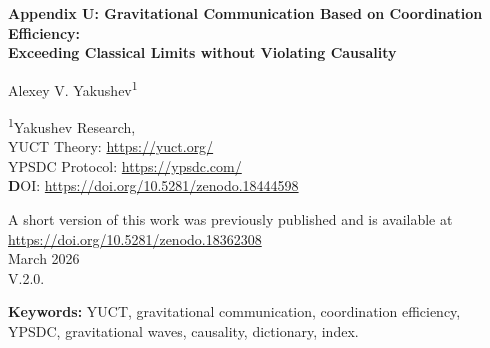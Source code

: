 \documentclass[12pt,a4paper]{article}
\newcommand{\Keff}{K_{\mathrm{eff}}}
\begin{document}
	
	\begin{titlepage}
		\begin{center}
			\vspace*{1cm}
			\Huge \textbf{Appendix U: Gravitational Communication Based on Coordination Efficiency: \\ Exceeding Classical Limits without Violating Causality}
			
			\vspace{1cm}
			\Large Alexey V. Yakushev\textsuperscript{1}
			
			\vspace{0.5cm}
			\large \textsuperscript{1}Yakushev Research, \\
	YUCT Theory: \url{https://yuct.org/}\\
YPSDC Protocol: \url{https://ypsdc.com/}\\


\vspace{2cm}
\textbf DOI: \url{https://doi.org/10.5281/zenodo.18444598}\\

\vspace{1cm}

\vspace{0cm}
\large 
A short version of this work was previously published and is available at\\ \url{https://doi.org/10.5281/zenodo.18362308}\\
\vspace{1cm}
March 2026 \\ \large V.2.0.
			
			\newpage
			\vspace{2cm}
			\begin{abstract}
				\noindent
				We propose a novel approach to long‑distance communication based on the Yakushev Unified Coordination Theory (YUCT). By treating the gravitational field as a naturally occurring global dictionary, we show that short indices (gravitational perturbations) can coordinate states between distant observers with an effective efficiency \(\Keff\) that formally exceeds the speed‑of‑light limit, yet without violating causality. The key lies in the separation of offline dictionary distribution (the pre‑existing gravitational field) and online index transmission (a light‑speed gravitational wave). Gravitational waves penetrate matter without attenuation, offering a significant advantage over electromagnetic signals. We derive the fundamental equations, estimate achievable efficiencies, and propose an experimental test using high‑precision gravimeters. This work opens a pathway toward a new class of communication systems where latency is determined by local processing rather than distance.
			\end{abstract}
			
			\vspace{0.5cm}
			\noindent \textbf{Keywords:} YUCT, gravitational communication, coordination efficiency, YPSDC, gravitational waves, causality, dictionary, index.
		\end{center}
	\end{titlepage}
	
\end{document}

